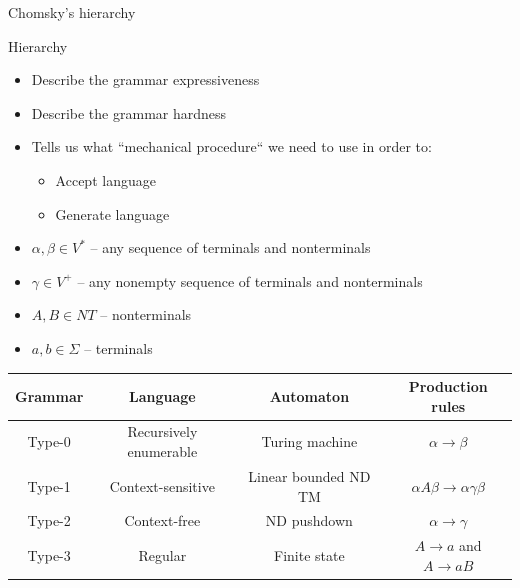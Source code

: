 \documentclass{beamer}
\begin{document}
\begin{frame}{Chomsky's hierarchy}

\begin{block}{Hierarchy}
\begin{itemize}
\item Describe the grammar expressiveness
\item Describe the grammar hardness
\item Tells us what ``mechanical procedure`` we need to use in order to:
\begin{itemize}
\item Accept language
\item Generate language
\end{itemize}
\item $\alpha, \beta\in V^{*}$ -- any sequence of terminals and nonterminals
\item $\gamma\in V^{+}$ -- any nonempty sequence of terminals and nonterminals
\item $A, B\in NT$ -- nonterminals
\item $a, b\in \Sigma$ -- terminals
\end{itemize}
\end{block}
\vskip -0.5cm
\begin{table}\footnotesize
\begin{tabular}{c|c|c|c}
\textbf{Grammar} & \textbf{Language} & \textbf{Automaton} & \textbf{Production rules} \\
\hline
Type-0 & Recursively enumerable & Turing machine &  $\alpha \rightarrow \beta$ \\ %
Type-1 & Context-sensitive & Linear bounded ND TM &$\alpha A\beta \rightarrow \alpha \gamma \beta$ \\ 
Type-2 & Context-free & ND pushdown & $\alpha \rightarrow \gamma$ \\ 
Type-3 & Regular & Finite state &$A\rightarrow a$ and $A\rightarrow aB$ 
\end{tabular}
\end{table}


\end{frame}
\end{document}
